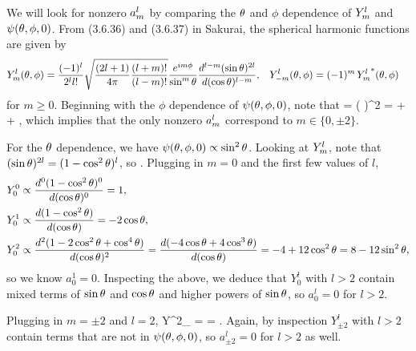\begin{solution}
	We will look for nonzero $a^l_m$ by comparing the $\theta$ and $\phi$ dependence of $Y^l_m$ and $\psi(\theta, \phi, 0)$.  From (3.6.36) and (3.6.37) in Sakurai, the spherical harmonic functions are given by
	\begin{align*}
		Y^l_m(\theta, \phi) &= \frac{(-1)^l}{2^l l!} \sqrt{\frac{(2l + 1)}{4\pi} \frac{(l + m)!}{(l - m)!}} \frac{e^{i m \phi}}{\sin^m{\theta}} \dv[l - m]{(\sin{\theta})^{2l}}{(\cos{\theta})}, &
		Y^l_{-m}(\theta, \phi) &= (-1)^m \, {Y^l_m}^*(\theta, \phi)
	\end{align*}
	for $m \geq 0$.  Beginning with the $\phi$ dependence of $\psi(\theta, \phi, 0)$, note that
	\beqn \label{cos}
		\psitpo \propto \coswp = \left(  \right)^2 =  +  + ,
	\eeqn
	which implies that the only nonzero $a^l_m$ correspond to $m \in \{ 0, \pm 2 \}$.
	
	For the $\theta$ dependence, we have $\psi(\theta, \phi, 0) \propto \sin^2{\theta}$.  Looking at $Y^l_m$, note that $(\sin{\theta})^{2l} = (1 - \cos^2{\theta})^l$, so
	\beq
		\Ylm \propto {} .
	\eeq
	Plugging in $m = 0$ and the first few values of $l$,
	\begin{align*}
		Y^0_0 &\propto \dv[0]{(1 - \cos^2{\theta})^0}{(\cos{\theta})} = 1, \\
		Y^1_0 &\propto \dv{(1 - \cos^2{\theta})}{(\cos{\theta})} = -2\cos{\theta}, \\
		Y^2_0 &\propto \dv[2]{(1 - 2\cos^2{\theta}+ \cos^4{\theta})}{(\cos{\theta})} = \dv{(-4 \cos{\theta}+ 4 \cos^3{\theta})}{(\cos{\theta})} = -4 + 12 \cos^2{\theta} = 8 - 12 \sin^2{\theta},
	\end{align*}
	so we know $a^1_0 = 0$.  Inspecting the above, we deduce that $Y^l_0$ with $l > 2$ contain mixed terms of $\sin{\theta}$ and $\cos{\theta}$ and higher powers of $\sin{\theta}$, so $a^l_0 = 0$ for $l > 2$.
	
	Plugging in $m = \pm 2$ and $l = 2$,
	\beq
		Y^2_{} \propto {}  =  = \sinwt.
	\eeq
	Again, by inspection $Y^l_{\pm2}$ with $l > 2$ contain terms that are not in $\psi(\theta, \phi, 0)$, so $a^l_{\pm2} = 0$ for $l > 2$ as well.
	

\end{solution}
